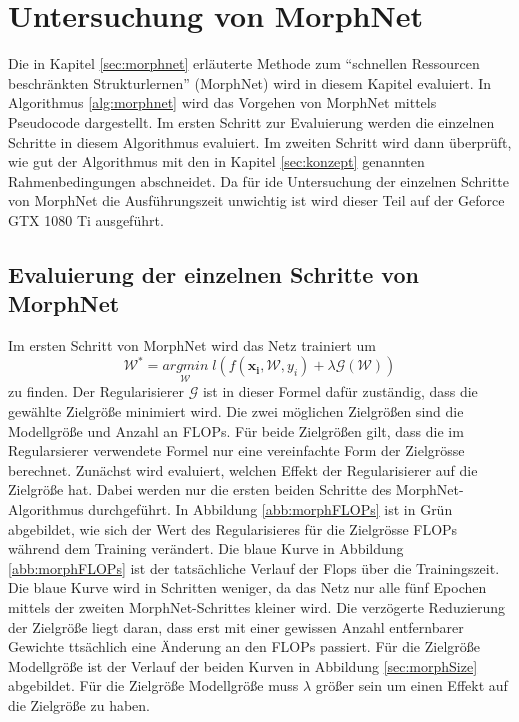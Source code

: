 \chapter{Untersuchung von MorphNet}\label{sec:morphexperimente}
\color{blue1}

Die in Kapitel \ref{sec:morphnet} erläuterte Methode zum ``schnellen Ressourcen beschränkten Strukturlernen'' (MorphNet) wird in diesem Kapitel evaluiert. In Algorithmus \ref{alg:morphnet} wird das Vorgehen von MorphNet mittels Pseudocode dargestellt. Im ersten Schritt zur Evaluierung werden die einzelnen Schritte in diesem Algorithmus evaluiert. Im zweiten Schritt wird dann überprüft, wie gut der Algorithmus mit den in Kapitel \ref{sec:konzept} genannten Rahmenbedingungen abschneidet. Da für ide Untersuchung der einzelnen Schritte von MorphNet die Ausführungszeit unwichtig ist wird dieser Teil auf der Geforce GTX 1080 Ti ausgeführt.

\section{Evaluierung der einzelnen Schritte von MorphNet}
Im ersten Schritt von MorphNet wird das Netz trainiert um 
\begin{equation}
\mathcal{W}^{\ast}=\underset{\mathcal{W}}{arg min}\; l(f(\mathbf{x_i}, \mathcal{W},y_i) + \lambda \mathcal{G}(\mathcal{W}))
\end{equation}
zu finden. Der Regularisierer $\mathcal{G}$ ist in dieser Formel dafür zuständig, dass die gewählte Zielgröße minimiert wird. Die zwei möglichen Zielgrößen sind die Modellgröße und Anzahl an FLOPs. Für beide Zielgrößen gilt, dass die im Regularsierer verwendete Formel nur eine vereinfachte Form der Zielgrösse berechnet. 
Zunächst wird evaluiert, welchen Effekt der Regularisierer auf die Zielgröße hat. Dabei werden nur die ersten beiden Schritte des MorphNet-Algorithmus durchgeführt.
In Abbildung \ref{abb:morphFLOPs} ist in Grün abgebildet, wie sich der Wert des Regularisieres für die Zielgrösse FLOPs während dem Training verändert. Die blaue Kurve in Abbildung \ref{abb:morphFLOPs} ist der tatsächliche Verlauf der Flops über die Trainingszeit. Die blaue Kurve wird in Schritten weniger, da das Netz nur alle fünf Epochen mittels der zweiten MorphNet-Schrittes kleiner wird. Die verzögerte Reduzierung der Zielgröße liegt daran, dass erst mit einer gewissen Anzahl entfernbarer Gewichte ttsächlich eine Änderung an den FLOPs passiert. Für die Zielgröße Modellgröße ist der Verlauf der beiden Kurven in Abbildung \ref{sec:morphSize} abgebildet. Für die Zielgröße Modellgröße muss $\lambda$ größer sein um einen Effekt auf die Zielgröße zu haben.

